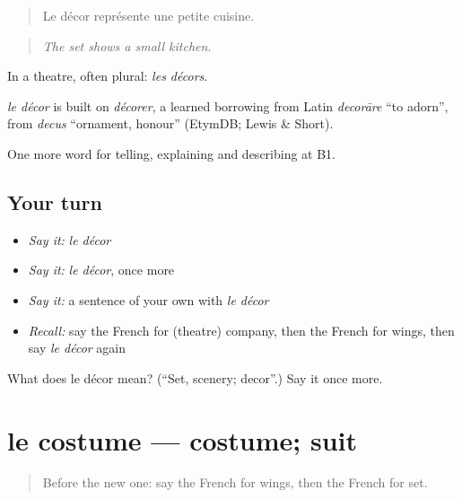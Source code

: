 \begin{quote}
Le décor représente une petite cuisine.
\end{quote}

\begin{quote}
\emph{The set shows a small kitchen.}
\end{quote}

In a theatre, often plural: \emph{les décors}.

\begin{cousinweb}
\emph{le décor} is built on \emph{décorer}, a learned borrowing from Latin \emph{decorāre} \textquotedblleft{}to adorn\textquotedblright{}, from \emph{decus} \textquotedblleft{}ornament, honour\textquotedblright{} (EtymDB; Lewis \& Short).
\end{cousinweb}

\begin{grammarlens}[title={What you've built}]
One more word for telling, explaining and describing at B1.
\end{grammarlens}

\subsection*{Your turn}
\begin{itemize}
\raggedright
  \item \emph{Say it:} \emph{le décor}
  \item \emph{Say it:} \emph{le décor}, once more
  \item \emph{Say it:} a sentence of your own with \emph{le décor}
  \item \emph{Recall:} say the French for (theatre) company, then the French for wings, then say \emph{le décor} again
\end{itemize}

\begin{tcolorbox}[breakable,colback=teal!4,colframe=teal!35!black,title={Before you move on}]
What does le décor mean? (\textquotedblleft{}Set, scenery; decor\textquotedblright{}.) Say it once more.
\end{tcolorbox}
\section[le costume]{le costume — costume; suit}

\label{lesson:FR-C514-costume}



\begin{quote}
Before the new one: say the French for wings, then the French for set.
\end{quote}

